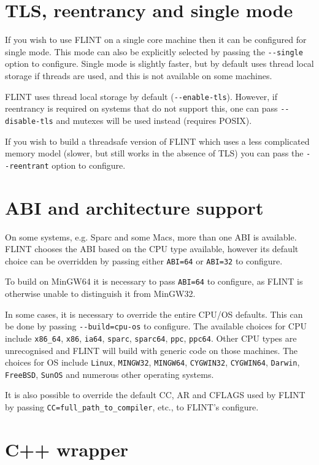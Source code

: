 \documentclass[a4paper,10pt]{book}
\newcommand{\code}{\lstinline}
\begin{document}
\chapter{TLS, reentrancy and single mode}

If you wish to use FLINT on a single core machine then it can be
configured for single mode. This mode can also be explicitly selected
by passing the \code{--single} option to configure. Single mode is
slightly faster, but by default uses thread local storage if threads
are used, and this is not available on some machines.

FLINT uses thread local storage by default (\code{--enable-tls}).
However, if reentrancy is required on systems that do not support
this, one can pass \code{--disable-tls} and mutexes will be used
instead (requires POSIX).

If you wish to build a threadsafe version of FLINT which uses a
less complicated memory model (slower, but still works in the absence
of TLS) you can pass the \code{--reentrant} option to configure.

\chapter{ABI and architecture support}

On some systems, e.g. Sparc and some Macs, more than one ABI is
available. FLINT chooses the ABI based on the CPU type available,
however its default choice can be overridden by passing either
\code{ABI=64} or \code{ABI=32} to configure.

To build on MinGW64 it is necessary to pass \code{ABI=64} to
configure, as FLINT is otherwise unable to distinguish it from
MinGW32.

In some cases, it is necessary to override the entire CPU/OS
defaults. This can be done by passing \code{--build=cpu-os} to
configure. The available choices for CPU include \code{x86_64},
\code{x86}, \code{ia64}, \code{sparc}, \code{sparc64}, \code{ppc},
\code{ppc64}. Other CPU types are unrecognised and FLINT will
build with generic code on those machines. The choices for OS
include \code{Linux}, \code{MINGW32}, \code{MINGW64},
\code{CYGWIN32}, \code{CYGWIN64}, \code{Darwin}, \code{FreeBSD},
\code{SunOS} and numerous other operating systems.

It is also possible to override the default CC, AR and CFLAGS used
by FLINT by passing \code{CC=full_path_to_compiler}, etc., to
FLINT's configure.

\chapter{C++ wrapper}
\end{document}
